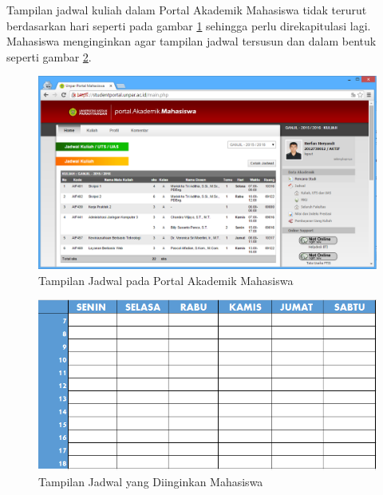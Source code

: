 \documentclass[a4paper,twoside]{article}
\begin{document}
\begin{enumerate}
\begin{enumerate}
	Tampilan jadwal kuliah dalam Portal Akademik Mahasiswa tidak terurut berdasarkan hari seperti pada gambar \ref{fig:3_jadwal_portal} sehingga perlu direkapitulasi lagi. Mahasiswa menginginkan agar tampilan jadwal tersusun dan dalam bentuk seperti gambar \ref{fig:3_jadwal_rekap}.
		\begin{figure}[H]
			\centering
			\includegraphics[scale=0.5]{Gambar/jadwal-portal}
			\caption{Tampilan Jadwal pada Portal Akademik Mahasiswa} 
			\label{fig:3_jadwal_portal}
		\end{figure}
		
		\begin{figure}[H]
			\centering
			\includegraphics[scale=0.5]{Gambar/jadwal-rekap}
			\caption{Tampilan Jadwal yang Diinginkan Mahasiswa} 
			\label{fig:3_jadwal_rekap}
		\end{figure}
		

\end{enumerate}
\end{enumerate}
\end{document}
